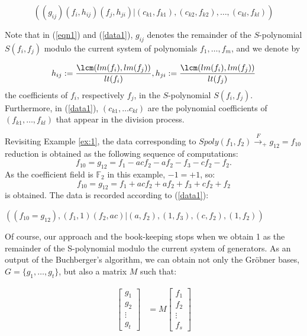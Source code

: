 \begin{equation}
\label{data1}
((g_{ij})(f_{i},h_{ij})(f_{j},h_{ji})| (c_{k1},f_{k1}),(c_{k2},f_{k2}),\dots,(c_{kl},f_{kl}))
\end{equation}

Note that in (\ref{eqn1}) and (\ref{data1}), $g_{ij}$ denotes the
remainder of the $S$-polynomial $S(f_i,f_j)$ modulo the current system
of polynomials $f_1,\ldots,f_m$, and we denote by  

$$h_{ij}:=\displaystyle\frac{\lcm(lm(f_i),lm(f_j))}{lt(f_i)},
h_{ji}:=\displaystyle\frac{\lcm(lm(f_i),lm(f_j))}{lt(f_j)}$$ 
the coefficients of $f_i$, respectively $f_j$, in the $S$-polynomial
$S(f_i,f_j)$. Furthermore, in (\ref{data1}), $(c_{k1}, \dots c_{kl})$ are the
polynomial coefficients of $(f_{k1}, \dots,f_{kl})$ that appear in the
division process. 

\begin{example}
Revisiting Example \ref{ex:1},  the data corresponding to
$Spoly(f_1,f_2)\xrightarrow{F}_+  g_{12} = f_{10}$ reduction is
obtained as the following sequence of computations:
$$f_{10}=g_{12}=f_1-acf_2-af_2-f_3-cf_2-f_2.$$ As the coefficient
field is $\mathbb{F}_2$ in this example, $-1 = +1$, so:
$$f_{10}=g_{12}=f_1+acf_2+af_2+f_3+cf_2+f_2$$ is obtained.
The data is recorded according to (\ref{data1}):

\begin{center}
$((f_{10}=g_{12}), (f_1,1)(f_2,ac)|(a,f_2),(1,f_3),(c,f_2),(1,f_2))$
\end{center}

\end{example}

Of course, our approach and the book-keeping stops when we obtain
1 as the remainder of the S-polynomial modulo the current system of
generators. As an output of the Buchberger's algorithm, we can obtain
not only the Gr\"obner bases,  $G = \{g_1,\ldots,g_t\}$, but also a
matrix $M$ such that: 
\begin{center}
\begin{align}
   \begin{bmatrix}
           g_{1} \\
           g_{2} \\
           \vdots \\
           g_{t}
         \end{bmatrix}
    &= M \begin{bmatrix}
           f_{1} \\
           f_{2} \\
           \vdots \\
           f_{s}
         \end{bmatrix}
  \end{align}

\end{center}

